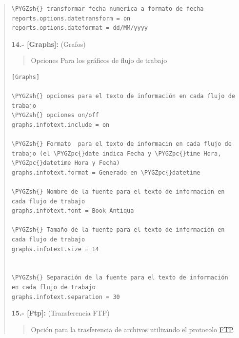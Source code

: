 \documentclass[letterpaper,11pt,spanish]{sphinxmanual}
\def\PYGZsh{\char`\#}
\def\PYGZpc{\char`\%}
\begin{document}
\begin{quote}
\begin{Verbatim}[commandchars=\\\{\}]
\PYGZsh{} transformar fecha numerica a formato de fecha
reports.options.datetransform = on
reports.options.dateformat = dd/MM/yyyy
\end{Verbatim}

\textbf{14.- {[}Graphs{]}:} (Grafos)
\begin{quote}

Opciones Para los gráficos de flujo de trabajo
\end{quote}

\begin{Verbatim}[commandchars=\\\{\}]
[Graphs]

\PYGZsh{} opciones para el texto de información en cada flujo de trabajo
\PYGZsh{} opciones on/off
graphs.infotext.include = on

\PYGZsh{} Formato  para el texto de informacin en cada flujo de trabajo (el \PYGZpc{}date indica Fecha y \PYGZpc{}time Hora, \PYGZpc{}datetime Hora y Fecha)
graphs.infotext.format = Generado en \PYGZpc{}datetime

\PYGZsh{} Nombre de la fuente para el texto de información en cada flujo de trabajo
graphs.infotext.font = Book Antiqua

\PYGZsh{} Tamaño de la fuente para el texto de información en cada flujo de trabajo
graphs.infotext.size = 14


\PYGZsh{} Separación de la fuente para el texto de información en cada flujo de trabajo
graphs.infotext.separation = 30
\end{Verbatim}

\textbf{15.- {[}Ftp{]}:} (Transferencia FTP)
\begin{quote}

Opción para la trasferencia de archivos utilizando el protocolo \href{http://es.wikipedia.org/wiki/File\_Transfer\_Protocol}{FTP}.
\end{quote}
\end{quote}
\end{document}
